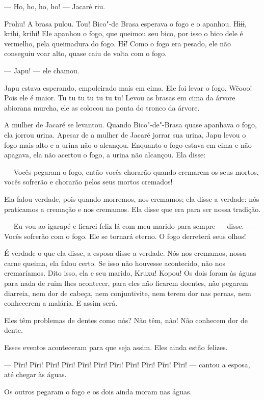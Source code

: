 --- Ho, ho, ho, ho! --- Jacaré riu. 

Prohu! A brasa pulou. Tou! Bico"-de Brasa esperava o fogo e
o apanhou. Hɨɨɨ, krihi, krihi! Ele apanhou o fogo, que queimou seu
bico, por isso o bico dele é vermelho, pela queimadura do
fogo. Hɨ̃! Como o fogo era pesado, ele não conseguiu voar alto,
quase caiu de volta com o fogo. 

--- Japu! --- ele chamou.

Japu estava esperando, empoleirado mais em cima. Ele foi levar o fogo.
Wẽooo! Pois ele é maior. Tu tu tu tu tu tu tu! Levou as brasas em cima
da árvore abiorana murcha, ele as colocou na ponta do tronco da árvore. 

A mulher de Jacaré se levantou. Quando Bico"-de"-Brasa quase apanhava o
fogo, ela jorrou urina. Apesar de a mulher de Jacaré jorrar sua urina,
Japu levou o fogo mais alto e a urina não o alcançou. Enquanto
o fogo estava em cima e não apagava, ela não acertou o fogo, a urina não
alcançou. Ela disse:

--- Vocês pegaram o fogo, então vocês chorarão quando cremarem os seus
mortos, vocês sofrerão e chorarão pelos seus mortos cremados! 

Ela falou verdade, pois quando morremos, nos cremamos; ela disse a
verdade: nós praticamos a cremação e nos cremamos. Ela disse que era
para ser nossa tradição. 

--- Eu vou ao igarapé e ficarei feliz lá com meu marido para sempre ---
disse. --- Vocês sofrerão com o fogo. Ele se tornará eterno. O fogo
derreterá seus olhos! 

É verdade o que ela disse, a esposa disse a verdade. Nós nos cremamos,
nossa carne queima, ela falou certo. Se isso não houvesse acontecido,
não nos cremaríamos. Dito isso, ela e seu marido, Kruxu! Kopou! Os dois
foram às águas para nada de ruim lhes acontecer, para eles não ficarem
doentes, não pegarem diarreia, nem dor de cabeça, nem conjuntivite, nem
terem dor nas pernas, nem conhecerem a malária. E assim será. 

Eles têm problemas de dentes como nós? Não têm, não! Não conhecem dor de
dente. 

Esses eventos aconteceram para que seja assim. Eles ainda estão
felizes. 

--- Pĩri! Pĩri! Pĩri! Pĩri! Pĩri! Pĩri! Pĩri! Pĩri! Pĩri! Pĩri! Pĩri!
--- cantou a esposa, até chegar às águas. 

Os outros pegaram o fogo e os dois ainda moram nas águas.
